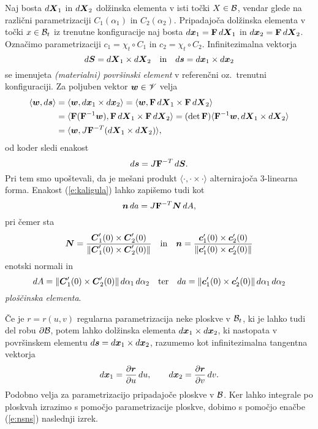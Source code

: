 Naj bosta $d\boldsymbol X_1$ in $d\boldsymbol X_2$ dolžinska elementa v isti točki $X\in\mathcal B$, vendar
glede na različni parametrizaciji $C_1(\alpha_1)$ in $C_2(\alpha_2)$. Pripadajoča dolžinska elementa
v točki $x\in\mathcal B_t$ iz trenutne konfiguracije naj bosta $d\boldsymbol x_1=\mathbf F\,d\boldsymbol X_1$
in $d\boldsymbol x_2=\mathbf F\,d\boldsymbol X_2$. Označimo parametrizaciji $c_1=\chi_t\circ C_1$ in $c_2=\chi_t\circ C_2$.
Infinitezimalna vektorja
\[
	d\boldsymbol S=d\boldsymbol X_1\times d\boldsymbol X_2\quad\textrm{in}\quad d\boldsymbol s=d\boldsymbol x_1\times d\boldsymbol x_2
\]
se imenujeta \emph{(materialni) površinski element} v referenčni oz.~trenutni konfiguraciji.
Za poljuben vektor $\boldsymbol w\in\mathscr V$ velja
\begin{align*}
	\langle\boldsymbol w,d\boldsymbol s\rangle &=
	\langle\boldsymbol w,d\boldsymbol x_1\times d\boldsymbol x_2\rangle
	=\langle\boldsymbol w,\mathbf F\,d\boldsymbol X_1\times\mathbf F\,d\boldsymbol X_2\rangle \\
	&= \langle\mathbf F(\mathbf F^{-1}\boldsymbol w),\mathbf F\,d\boldsymbol X_1\times\mathbf F\,d\boldsymbol X_2\rangle
	=(\det\mathbf F)\langle\mathbf F^{-1}\boldsymbol w,d\boldsymbol X_1\times d\boldsymbol X_2\rangle \\
	&=\langle\boldsymbol w, J\mathbf F^{-T}(d\boldsymbol X_1\times d\boldsymbol X_2)\rangle,
\end{align*}
od koder sledi enakost
\begin{equation} \label{e:kaligula}
	d\boldsymbol s=J\mathbf F^{-T}\,d\boldsymbol S.
\end{equation}
Pri tem smo upoštevali, da je mešani produkt $\langle\cdot,\cdot\times\cdot\rangle$
alternirajoča 3-linearna forma. Enakost (\ref{e:kaligula}) lahko zapišemo tudi kot
\begin{equation} \label{e:nsns}
	\boldsymbol n\,da=J\mathbf F^{-T}\boldsymbol N\,dA,
\end{equation}
pri čemer sta
\[
	\boldsymbol N=\frac{\boldsymbol C_1'(0)\times\boldsymbol C_2'(0)}{\|\boldsymbol C_1'(0)\times\boldsymbol C_2'(0)\|}
	\quad\textrm{in}\quad
	\boldsymbol n=\frac{\boldsymbol c_1'(0)\times\boldsymbol c_2'(0)}{\|\boldsymbol c_1'(0)\times\boldsymbol c_2'(0)\|}
\]
enotski normali in
\[
	dA=\|\boldsymbol C_1'(0)\times\boldsymbol C_2'(0)\|\,d\alpha_1\,d\alpha_2\quad\textrm{ter}
	\quad da=\|\boldsymbol c_1'(0)\times\boldsymbol c_2'(0)\|\,d\alpha_1\,d\alpha_2
\]
\emph{ploščinska elementa}.

Če je $r=r(u,v)$ regularna parametrizacija neke ploskve v $\mathcal B_t$, ki je lahko tudi
del robu $\partial\mathcal B$, potem lahko dolžinska elementa $d\boldsymbol x_1\times d\boldsymbol x_2$,
ki nastopata v površinskem elementu $d\boldsymbol s=d\boldsymbol x_1\times d\boldsymbol x_2$, razumemo kot
infinitezimalna tangentna vektorja
\[
	d\boldsymbol x_1=\frac{\partial \boldsymbol r}{\partial u}\,du,\qquad
	d\boldsymbol x_2=\frac{\partial \boldsymbol r}{\partial v}\,dv.
\]
Podobno velja za parametrizacijo pripadajoče ploskve v $\mathcal B$.
Ker lahko integrale po ploskvah izrazimo s pomočjo parametrizacije ploskve, dobimo
s pomočjo enačbe (\ref{e:nsns}) naslednji izrek.

